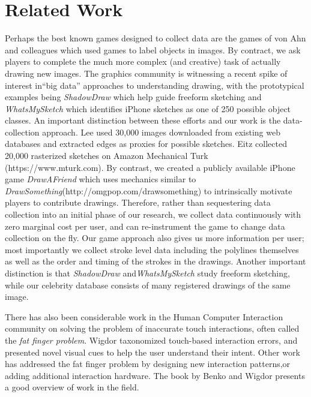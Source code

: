 \section{Related Work}

Perhaps the best known games designed to collect data are the games of von Ahn and colleagues  which used games to label objects in images. By contract, we ask players to complete the much more complex (and creative) task of actually drawing new images. The graphics community is witnessing a recent spike of interest in``big data'' approaches to understanding drawing, with the prototypical examples being \emph{ShadowDraw} \cite{Lee:2011} which help guide freeform sketching and \emph{WhatsMySketch}\cite{Eitz:2012:HSO} which identifies iPhone sketches as one of 250 possible object classes. An important distinction between these efforts and our work is the data-collection approach. Lee \etal used 30,000 images downloaded from existing web databases and extracted edges as proxies for possible sketches. Eitz \etal collected 20,000 rasterized sketches on Amazon Mechanical Turk (https://www.mturk.com). By contrast, we created a publicly available iPhone game \emph{DrawAFriend} which uses mechanics similar to \emph{DrawSomething}(http://omgpop.com/drawsomething) to intrinsically motivate players to contribute drawings. Therefore, rather than sequestering data collection into an initial phase of our research, we collect data continuously with zero marginal cost per user, and can re-instrument the game to change data collection on the fly. Our game approach also gives us more information per user; most importantly we collect stroke level data including the polylines themselves as well as the order and timing of the strokes in the drawings. Another important distinction is that \emph{ShadowDraw} and\emph{WhatsMySketch} study freeform sketching, while our celebrity database consists of many registered drawings of the same image.

There has also been considerable work in the Human Computer Interaction community on solving the problem of inaccurate touch interactions, often called the \emph{fat finger problem}. Wigdor\etal {} taxonomized touch-based interaction errors, and presented novel visual cues to help the user understand their intent. Other work has addressed the fat finger problem by designing new interaction patterns\cite{Albinsson:2003:HPT,Benko:2006:PST,Forlines06hybridpointing,Vogel07shift:a},or adding additional interaction hardware\cite{Scott:2010:RTE,Wigdor:2006:UTI,Wigdor:2007:LTS}. The book by Benko and Wigdor  presents a good overview of work in the field.


